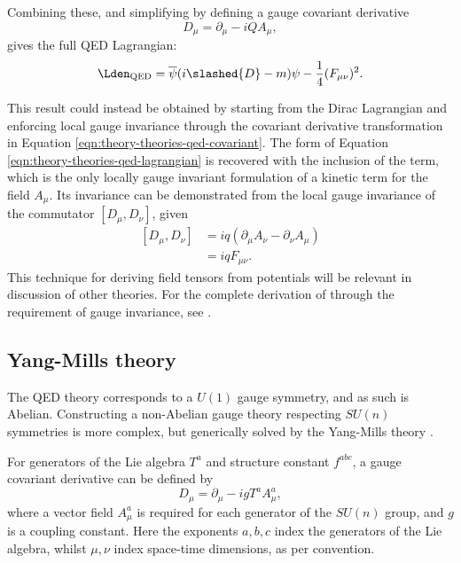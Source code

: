 Combining these, and simplifying by defining a gauge covariant derivative
\begin{equation}
  D_\mu = \partial_\mu - iQA_\mu,
  \label{eqn:theory-theories-qed-covariant}
\end{equation}
gives the full \ac{QED} Lagrangian:
%
\begin{equation*}
  \LQED = \overline{\psi}(i\slashed{D} - m)\psi
                   - \frac14 (F_{\mu\nu})^2.
  \label{eqn:theory-theories-qed-lagrangian}
\end{equation*}

This result could instead be obtained by starting from the Dirac Lagrangian and
enforcing local gauge invariance through the covariant derivative transformation
in Equation \ref{eqn:theory-theories-qed-covariant}. The form of Equation
\ref{eqn:theory-theories-qed-lagrangian} is recovered with the inclusion of the
\LEM term, which is the only locally gauge invariant formulation of a kinetic
term for the field $A_\mu$. Its invariance can be demonstrated from the local
gauge invariance of the commutator $[D_\mu,D_\nu]$, given
\begin{equation}
  \begin{split}
    [D_\mu,D_\nu] &= iq(\partial_\mu A_\nu - \partial_\nu A_\mu)\\
                  &= iqF_{\mu\nu}.
  \end{split}
  \label{eqn:theory-theories-qed-covariant-commutator}
\end{equation}
%
This technique for deriving field tensors from potentials will be relevant in
discussion of other theories. For the complete derivation of \LQED through the
requirement of gauge invariance, see \cite[pp.482-6]{Peskin1995}.

%

\subsection{Yang-Mills theory}
\label{sec:theory-theories-ym}

The \ac{QED} theory corresponds to a $U(1)$ gauge symmetry, and
as such is Abelian. Constructing a non-Abelian gauge theory respecting $SU(n)$
symmetries is more complex, but generically solved by the Yang-Mills theory
\cite{Yang1954}.

For generators of the Lie algebra $T^a$ and structure constant $f^{abc}$,
a gauge covariant derivative can be defined by
\begin{equation*}
  D_\mu = \partial_\mu - igT^a A^a_\mu,
\end{equation*}
where a vector field $A^a_\mu$ is required for each generator of the $SU(n)$
group, and $g$ is a coupling constant. Here the exponents $a,b,c$ index the
generators of the Lie algebra, whilst $\mu,\nu$ index space-time dimensions, as
per convention. 

